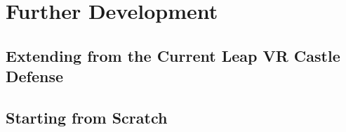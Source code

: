 \documentclass[a4paper]{refart}
\begin{document}
\section{Further Development}

\subsection{Extending from the Current Leap VR Castle Defense}

\subsection{Starting from Scratch}
\end{document}
